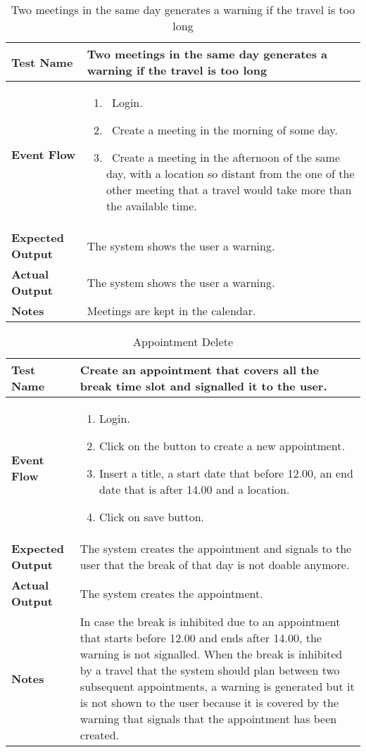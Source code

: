 \begin{table}[h]	
\centering
\def\arraystretch{1.5}
\begin{tabular}{|m{7cm}|m{7cm}|}
	\hline
	\textbf{Test Name}            &  Two meetings in the same day generates a warning if the travel is too long  \\ \hline
	\textbf{Event Flow}             &   
		\begin{enumerate}
			\item~Login.
			\item~Create a meeting in the morning of some day.
			\item~Create a meeting in the afternoon of the same day, with a location so distant from the one of the other meeting that a travel would take more than the available time.
		\end{enumerate}
	\\ \hline
	\textbf{Expected Output}  &  The system shows the user a warning.   \\ \hline
	\textbf{Actual Output}       &   The system shows the user a warning.  \\ \hline
	\textbf{Notes} &  Meetings are kept in the calendar.   \\ \hline
\end{tabular}
\caption{Two meetings in the same day generates a warning if the travel is too long}
\end{table}


\begin{table}[h]	
	\centering
	\def\arraystretch{1.5}
	\begin{tabular}{|m{7cm}|m{7cm}|}
		\hline
		\textbf{Test Name}            & Create an appointment that covers all the break time slot and signalled it to the user.\\ \hline
		\textbf{Event Flow}             & 
		\begin{enumerate}
			\item Login.
			\item Click on the button to create a new appointment.
			\item Insert a title, a start date that before 12.00, an end date that is after 14.00 and a location.
			\item Click on save button.
		\end{enumerate} \\ \hline
		\textbf{Expected Output}  &  The system creates the appointment and signals to the user that the break of that day is not doable anymore.  \\ \hline
		\textbf{Actual Output}       & The system creates the appointment.   \\ \hline
		\textbf{Notes} & In case the break is inhibited due to an appointment that starts before 12.00 and ends after 14.00, the warning is not signalled. When the break is inhibited by a travel that the system should plan between two subsequent appointments, a warning is generated but it is not shown to the user because it is covered by the warning that signals that the appointment has been created. \\ \hline
	\end{tabular}
	\caption{Appointment Delete}
\end{table}


